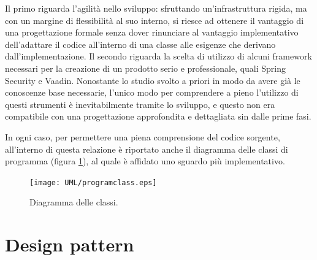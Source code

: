 Il primo riguarda l'agilità nello sviluppo: sfruttando un'infrastruttura rigida, ma con un margine di flessibilità al suo interno, si riesce ad ottenere il vantaggio di una progettazione formale senza dover rinunciare al vantaggio implementativo dell'adattare il codice all'interno di una classe alle esigenze che derivano dall'implementazione.
Il secondo riguarda la scelta di utilizzo di alcuni framework necessari per la creazione di un prodotto serio e professionale, quali Spring Security e Vaadin. Nonostante lo studio svolto a priori in modo da avere già le conoscenze base necessarie, l'unico modo per comprendere a pieno l'utilizzo di questi strumenti è inevitabilmente tramite lo sviluppo, e questo non era compatibile con una progettazione approfondita e dettagliata sin dalle prime fasi.

In ogni caso, per permettere una piena comprensione del codice sorgente, all'interno di questa relazione è riportato anche il diagramma delle classi di programma (figura \ref{fig:programclassdiag}), al quale è affidato uno sguardo più implementativo.

\begin{figure}[ht]
	\centering
	\texttt{[image: UML/programclass.eps]}
	\caption{Diagramma delle classi.}
	\label{fig:programclassdiag}
\end{figure}


\section{Design pattern}\label{pattern}


